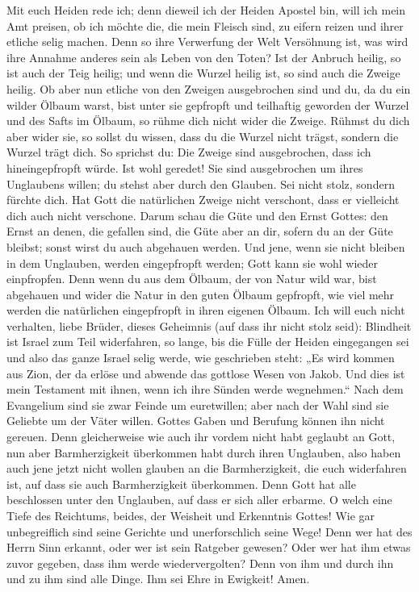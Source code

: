  Mit euch Heiden rede ich; denn dieweil ich der Heiden
Apostel bin, will ich mein Amt preisen,  ob ich möchte
die, die mein Fleisch sind, zu eifern reizen und ihrer etliche selig
machen.  Denn so ihre Verwerfung der Welt Versöhnung ist,
was wird ihre Annahme anderes sein als Leben von den Toten?
 Ist der Anbruch heilig, so ist auch der Teig heilig; und
wenn die Wurzel heilig ist, so sind auch die Zweige heilig.
 Ob aber nun etliche von den Zweigen ausgebrochen sind
und du, da du ein wilder Ölbaum warst, bist unter sie gepfropft und
teilhaftig geworden der Wurzel und des Safts im Ölbaum, 
so rühme dich nicht wider die Zweige. Rühmst du dich aber wider sie, so
sollst du wissen, dass du die Wurzel nicht trägst, sondern die Wurzel
trägt dich.  So sprichst du: Die Zweige sind
ausgebrochen, dass ich hineingepfropft würde.  Ist wohl
geredet! Sie sind ausgebrochen um ihres Unglaubens willen; du stehst
aber durch den Glauben. Sei nicht stolz, sondern fürchte dich.
 Hat Gott die natürlichen Zweige nicht verschont, dass er
vielleicht dich auch nicht verschone.  Darum schau die
Güte und den Ernst Gottes: den Ernst an denen, die gefallen sind, die
Güte aber an dir, sofern du an der Güte bleibst; sonst wirst du auch
abgehauen werden.  Und jene, wenn sie nicht bleiben in
dem Unglauben, werden eingepfropft werden; Gott kann sie wohl wieder
einpfropfen.  Denn wenn du aus dem Ölbaum, der von Natur
wild war, bist abgehauen und wider die Natur in den guten Ölbaum
gepfropft, wie viel mehr werden die natürlichen eingepfropft in ihren
eigenen Ölbaum.  Ich will euch nicht verhalten, liebe
Brüder, dieses Geheimnis (auf dass ihr nicht stolz seid): Blindheit ist
Israel zum Teil widerfahren, so lange, bis die Fülle der Heiden
eingegangen sei  und also das ganze Israel selig werde,
wie geschrieben steht: „Es wird kommen aus Zion, der da erlöse und
abwende das gottlose Wesen von Jakob.  Und dies ist mein
Testament mit ihnen, wenn ich ihre Sünden werde wegnehmen.``
 Nach dem Evangelium sind sie zwar Feinde um euretwillen;
aber nach der Wahl sind sie Geliebte um der Väter willen.
 Gottes Gaben und Berufung können ihn nicht gereuen.
 Denn gleicherweise wie auch ihr vordem nicht habt
geglaubt an Gott, nun aber Barmherzigkeit überkommen habt durch ihren
Unglauben,  also haben auch jene jetzt nicht wollen
glauben an die Barmherzigkeit, die euch widerfahren ist, auf dass sie
auch Barmherzigkeit überkommen.  Denn Gott hat alle
beschlossen unter den Unglauben, auf dass er sich aller erbarme.
 O welch eine Tiefe des Reichtums, beides, der Weisheit
und Erkenntnis Gottes! Wie gar unbegreiflich sind seine Gerichte und
unerforschlich seine Wege!  Denn wer hat des Herrn Sinn
erkannt, oder wer ist sein Ratgeber gewesen?  Oder wer
hat ihm etwas zuvor gegeben, dass ihm werde wiedervergolten?
 Denn von ihm und durch ihn und zu ihm sind alle Dinge.
Ihm sei Ehre in Ewigkeit! Amen.

